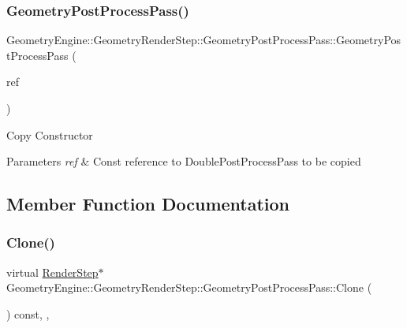 \subsubsection{\texorpdfstring{GeometryPostProcessPass()}{GeometryPostProcessPass()}}
{\footnotesize\ttfamily Geometry\+Engine\+::\+Geometry\+Render\+Step\+::\+Geometry\+Post\+Process\+Pass\+::\+Geometry\+Post\+Process\+Pass (\begin{DoxyParamCaption}\item[{const \mbox{\hyperlink{class_geometry_engine_1_1_geometry_render_step_1_1_geometry_post_process_pass}{Geometry\+Post\+Process\+Pass}} \&}]{ref }\end{DoxyParamCaption})\hspace{0.3cm}{\ttfamily [inline]}}

Copy Constructor 
\begin{DoxyParams}{Parameters}
{\em ref} & Const reference to Double\+Post\+Process\+Pass to be copied \\
\hline
\end{DoxyParams}


\subsection{Member Function Documentation}
\mbox{\label{class_geometry_engine_1_1_geometry_render_step_1_1_geometry_post_process_pass_ab9eab79bba7251936921032596be21fe}} 
\subsubsection{\texorpdfstring{Clone()}{Clone()}}
{\footnotesize\ttfamily virtual \mbox{\hyperlink{class_geometry_engine_1_1_geometry_render_step_1_1_render_step}{Render\+Step}}$\ast$ Geometry\+Engine\+::\+Geometry\+Render\+Step\+::\+Geometry\+Post\+Process\+Pass\+::\+Clone (\begin{DoxyParamCaption}{ }\end{DoxyParamCaption}) const\hspace{0.3cm}{\ttfamily [inline]}, {\ttfamily [override]}, {\ttfamily [virtual]}}

